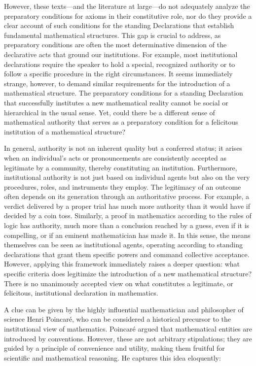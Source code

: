 \documentclass[11pt,a4paper]{article}
\begin{document}
However, these texts—and the literature at large—do not adequately analyze the preparatory conditions for axioms in their constitutive role, nor do they provide a clear account of such conditions for the standing Declarations that establish fundamental mathematical structures. This gap is crucial to address, as preparatory conditions are often the most determinative dimension of the declarative acts that ground our institutions. For example, most institutional declarations require the speaker to hold a special, recognized authority or to follow a specific procedure in the right circumstances. It seems immediately strange, however, to demand similar requirements for the introduction of a mathematical structure. The preparatory conditions for a standing Declaration that successfully institutes a new mathematical reality cannot be social or hierarchical in the usual sense. Yet, could there be a different sense of mathematical authority that serves as a preparatory condition for a felicitous institution of a mathematical structure?  

In general, authority is not an inherent quality but a conferred status; it arises when an individual's acts or pronouncements are consistently accepted as legitimate by a community, thereby constituting an institution. Furthermore, institutional authority is not just based on individual agents but also on the very procedures, roles, and instruments they employ. The legitimacy of an outcome often depends on its generation through an authoritative process. For example, a verdict delivered by a proper trial has much more authority than it would have if decided by a coin toss. Similarly, a proof in mathematics according to the rules of logic has authority, much more than a conclusion reached by a guess, even if it is compelling, or if an eminent mathematician has made it. In this sense, the means themselves can be seen as institutional agents, operating according to standing declarations that grant them specific powers and command collective acceptance. However, applying this framework immediately raises a deeper question: what specific criteria does legitimize the introduction of a new mathematical structure? There is no unanimously accepted view on what constitutes a legitimate, or felicitous, institutional declaration in mathematics. 

A clue can be given by the highly influential mathematician and philosopher of science Henri Poincaré, who can be considered a historical precursor to the institutional view of mathematics. Poincaré argued that mathematical entities are introduced by conventions. However, these are not arbitrary stipulations; they are guided by a principle of convenience and utility, making them fruitful for scientific and mathematical reasoning. He captures this idea eloquently: 
\end{document}
